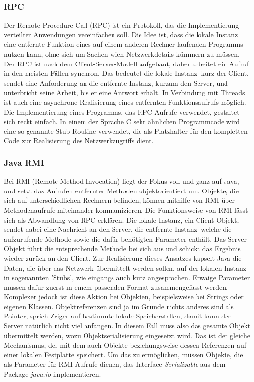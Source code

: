 \documentclass[letterpaper, 12pt]{article}
\let\tempsubsubsection\subsubsection
\renewcommand\subsubsection[1]{\vspace{0cm}\tempsubsubsection{#1}\vspace{0cm}}
\begin{document}
\subsubsection{RPC}

Der Remote Procedure Call (RPC) ist ein Protokoll, das die Implementierung verteilter Anwendungen vereinfachen soll. Die Idee ist, dass die lokale Instanz eine entfernte Funktion eines auf einem anderen Rechner laufenden Programms nutzen kann, ohne sich um Sachen wien Netzwerkdetails kümmern zu müssen. Der RPC ist nach dem Client-Server-Modell aufgebaut, daher arbeitet ein Aufruf in den meisten Fällen synchron. Das bedeutet die lokale Instanz, kurz der Client, sendet eine Anforderung an die entfernte Instanz, kurzum den Server, und unterbricht seine Arbeit, bis er eine Antwort erhält. In Verbindung mit Threads ist auch eine asynchrone Realisierung eines entfernten Funktionsaufrufs möglich. Die Implementierung eines Programms, das RPC-Aufrufe verwendet, gestaltet sich recht einfach. In einem der Sprache C sehr ähnlichen Programmcode wird eine so genannte Stub-Routine verwendet, die als Platzhalter für den kompletten Code zur Realisierung des Netzwerkzugriffs dient. \citep{rpc}

\subsubsection{Java RMI}

Bei RMI (Remote Method Invocation) liegt der Fokus voll und ganz auf Java, und setzt das Aufrufen entfernter Methoden objektorientiert um. Objekte, die sich auf unterschiedlichen Rechnern befinden, können mithilfe von RMI über Methodenaufrufe miteinander kommunizieren. Die Funktionsweise von RMI lässt sich als Abwandlung von RPC erklären. Die lokale Instanz, ein Client-Objekt, sendet dabei
eine Nachricht an den Server, die entfernte Instanz, welche die aufzurufende Methode sowie die dafür
benötigten Parameter enthält. Das Server-Objekt führt die entsprechende
Methode bei sich aus und schickt das Ergebnis wieder zurück an den Client. Zur Realisierung dieses Ansatzes kapselt Java die Daten, die über das Netzwerk
übermittelt werden sollen, auf der lokalen Instanz in sogenannten
'Stubs', wie eingangs auch kurz angesprochen. Etwaige Parameter müssen dafür zuerst in einem passenden Format
zusammengefasst werden. Komplexer jedoch ist diese Aktion bei Objekten, beispielsweise bei Strings oder
eigenen Klassen. Objektreferenzen sind ja im Grunde nichts anderes sind als
Pointer, sprich Zeiger auf bestimmte lokale Speicherstellen, damit kann der Server natürlich
nicht viel anfangen. In diesem Fall muss also das gesamte Objekt übermittelt werden,
wozu Objektserialisierung eingesetzt wird. Das ist der gleiche Mechanismus, der mit dem auch Objekte beziehungsweise dessen Referenzen auf
einer lokalen Festplatte speichert. Um das zu ermöglichen,
müssen Objekte, die als Parameter für RMI-Aufrufe dienen, das Interface
\textit{Serializable} aus dem Package \textit{java.io} implementieren. \citep{rmi}
\end{document}
